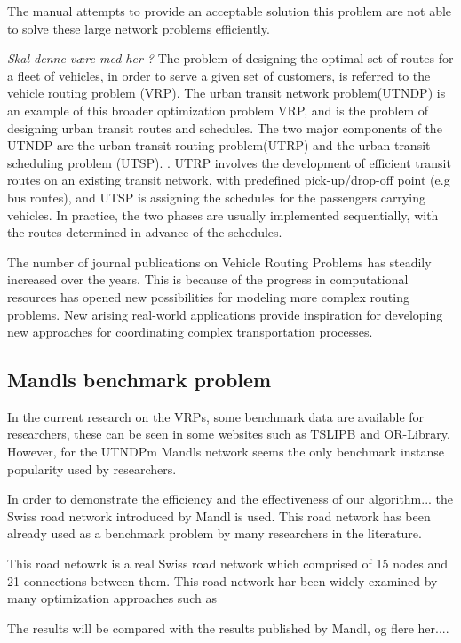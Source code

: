  The manual attempts to provide an acceptable solution this problem are not able to solve these large network problems efficiently.

\textit{Skal denne være med her ?}
 The problem of designing the optimal set of routes for a fleet of vehicles, in order to serve a given set of customers, is referred to the vehicle routing problem (VRP). The urban transit network problem(UTNDP) is an example of this broader optimization problem VRP, and is the problem of designing urban transit routes and schedules. The two major components of the UTNDP are the urban transit routing problem(UTRP) and the urban transit scheduling problem (UTSP). \citep{fan09}. UTRP involves the development of efficient transit routes on an existing transit network, with predefined pick-up/drop-off point (e.g bus routes), and UTSP is assigning the schedules for the passengers carrying vehicles. In practice, the two phases are usually implemented sequentially, with the routes determined in advance of the schedules. 

 The number of journal publications on Vehicle Routing Problems has steadily increased over the years. This is because of the progress in computational resources has opened new possibilities for modeling more complex routing problems. New arising real-world applications provide inspiration for developing new approaches for coordinating complex transportation processes.  \citep{vehiclerouting}



\subsection{Mandls benchmark problem}
In the current research on the VRPs, some benchmark data are available for researchers, these can be seen in some websites such as TSLIPB and OR-Library. However, for the UTNDPm Mandls network seems the only benchmark instanse popularity used by researchers. 

In order to demonstrate the efficiency and the effectiveness of our algorithm... the Swiss road network introduced by Mandl is used. This road network has been already used as a benchmark problem by many researchers in the literature. \citep{kechagiopoulos14}

This road netowrk is a real Swiss road network which comprised of 15 nodes and 21 connections between them. This road network har been widely examined by many optimization approaches such as \citep{kechagiopoulos14}

The results will be compared with the results published by Mandl, og flere her....